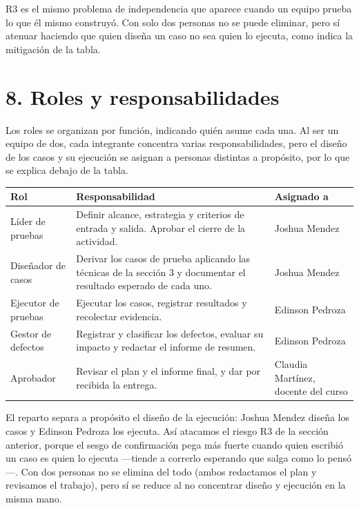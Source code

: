 \documentclass[11pt,a4paper]{article}
\begin{document}
R3 es el mismo problema de independencia que aparece cuando un equipo prueba lo que
él mismo construyó. Con solo dos personas no se puede eliminar, pero sí atenuar
haciendo que quien diseña un caso no sea quien lo ejecuta, como indica la mitigación de la tabla.

\section*{8. Roles y responsabilidades}

Los roles se organizan por función, indicando quién asume cada una. Al ser un
equipo de dos, cada integrante concentra varias responsabilidades, pero el diseño
de los casos y su ejecución se asignan a personas distintas a propósito, por lo que
se explica debajo de la tabla.

\begingroup
\small
\renewcommand{\arraystretch}{1.2}
\begin{center}\small
{}
\begin{tabularx}{\textwidth}{@{}L{3.4cm} Y L{3.2cm}@{}}
\toprule
\textbf{Rol} & \textbf{Responsabilidad} & \textbf{Asignado a} \\
\midrule
Líder de pruebas & Definir alcance, estrategia y criterios de entrada y salida. Aprobar el cierre de la actividad. & Joshua Mendez \\
Diseñador de casos & Derivar los casos de prueba aplicando las técnicas de la sección 3 y documentar el resultado esperado de cada uno. & Joshua Mendez \\
Ejecutor de pruebas & Ejecutar los casos, registrar resultados y recolectar evidencia. & Edinson Pedroza \\
Gestor de defectos & Registrar y clasificar los defectos, evaluar su impacto y redactar el informe de resumen. & Edinson Pedroza \\
Aprobador & Revisar el plan y el informe final, y dar por recibida la entrega. & Claudia Martínez, docente del curso \\
\bottomrule
\end{tabularx}
\end{center}
\endgroup

El reparto separa a propósito el diseño de la ejecución: Joshua Mendez diseña los
casos y Edinson Pedroza los ejecuta. Así atacamos el riesgo R3 de la sección
anterior, porque el sesgo de confirmación pega más fuerte cuando quien escribió un
caso es quien lo ejecuta —tiende a correrlo esperando que salga como lo pensó—. Con
dos personas no se elimina del todo (ambos redactamos el plan y revisamos el
trabajo), pero sí se reduce al no concentrar diseño y ejecución en la misma mano.
\end{document}
